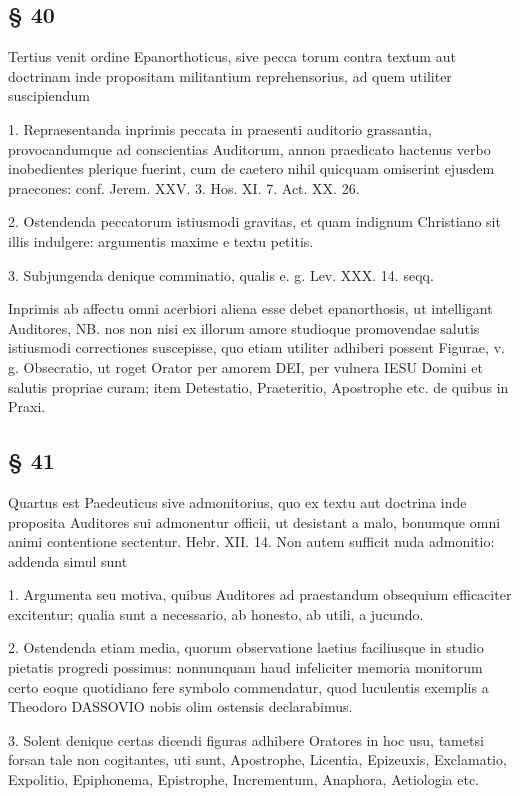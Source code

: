 \subsection{§ 40}

Tertius venit ordine Epanorthoticus, sive pecca%
torum contra textum aut doctrinam inde propositam militantium reprehensorius, ad quem utiliter suscipiendum

1. Repraesentanda inprimis peccata in praesenti auditorio grassantia, provocandumque ad conscientias Auditorum, annon praedicato hactenus verbo inobedientes plerique fuerint, cum de caetero nihil quicquam omiserint ejusdem praecones: conf. Jerem. XXV. 3. Hos. XI. 7. Act. XX. 26.

2. Ostendenda peccatorum istiusmodi gravitas, et quam indignum Christiano sit illis indulgere: argumentis maxime e textu petitis.

3. Subjungenda denique comminatio, qualis e. g. Lev. XXX. 14. seqq.

Inprimis ab affectu omni acerbiori aliena esse debet epanorthosis, ut intelligant Auditores, NB. nos non nisi ex illorum amore studioque promovendae salutis istiusmodi correctiones suscepisse, quo etiam utiliter adhiberi possent Figurae, v. g. Obsecratio, ut roget Orator per amorem DEI, per vulnera IESU Domini et salutis propriae curam; item Detestatio, Praeteritio, Apostrophe etc. de quibus in Praxi.

\subsection{§ 41}

Quartus est Paedeuticus sive admonitorius, quo ex textu aut doctrina inde proposita Auditores sui admonentur officii, ut desistant a malo, bonumque omni animi contentione sectentur. Hebr. XII. 14. Non autem sufficit nuda admonitio: addenda simul sunt

1. Argumenta seu motiva, quibus Auditores ad praestandum obsequium efficaciter excitentur; qualia sunt a necessario, ab honesto, ab utili, a jucundo.

2. Ostendenda etiam media, quorum observatione
laetius faciliusque in studio pietatis progredi possimus: nonnunquam haud infeliciter memoria monitorum certo eoque quotidiano fere symbolo commendatur, quod luculentis exemplis a Theodoro DASSOVIO nobis olim ostensis declarabimus.

3. Solent denique certas dicendi figuras adhibere Oratores in hoc usu, tametsi forsan tale non cogitantes, uti sunt, Apostrophe, Licentia, Epizeuxis, Exclamatio, Expolitio, Epiphonema, Epistrophe, Incrementum, Anaphora, Aetiologia etc.

